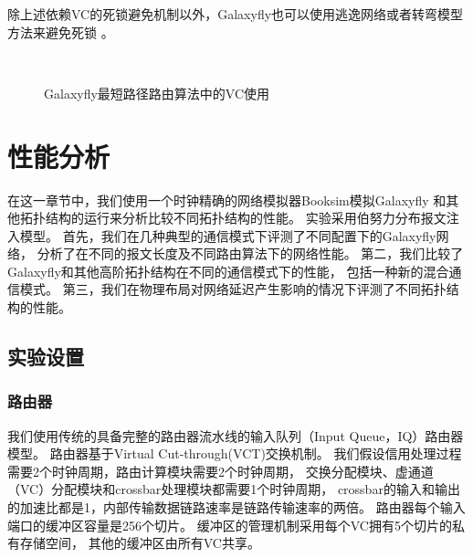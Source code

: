除上述依赖VC的死锁避免机制以外，Galaxyfly也可以使用逃逸网络或者转弯模型方法来避免死锁
。

\begin{figure}[t]
  \centering
   \begin{minipage}[t]{\textwidth}
   \centering
  \\
  \caption{Galaxyfly最短路径路由算法中的VC使用}
  \label{fig:Figure9}
  \end{minipage}
\end{figure}

\section{性能分析}

在这一章节中，我们使用一个时钟精确的网络模拟器Booksim模拟Galaxyfly
和其他拓扑结构的运行来分析比较不同拓扑结构的性能。
实验采用伯努力分布报文注入模型。
首先，我们在几种典型的通信模式下评测了不同配置下的Galaxyfly网络，
分析了在不同的报文长度及不同路由算法下的网络性能。
第二，我们比较了Galaxyfly和其他高阶拓扑结构在不同的通信模式下的性能，
包括一种新的混合通信模式。
第三，我们在物理布局对网络延迟产生影响的情况下评测了不同拓扑结构的性能。

\subsection{实验设置}

\subsubsection{路由器}

我们使用传统的具备完整的路由器流水线的输入队列（Input Queue，IQ）路由器模型。
路由器基于Virtual Cut-through(VCT)交换机制。
我们假设信用处理过程需要2个时钟周期，路由计算模块需要2个时钟周期，
交换分配模块、虚通道（VC）分配模块和crossbar处理模块都需要1个时钟周期，
crossbar的输入和输出的加速比都是1，内部传输数据链路速率是链路传输速率的两倍。
路由器每个输入端口的缓冲区容量是256个切片。
缓冲区的管理机制采用每个VC拥有5个切片的私有存储空间，
其他的缓冲区由所有VC共享。

